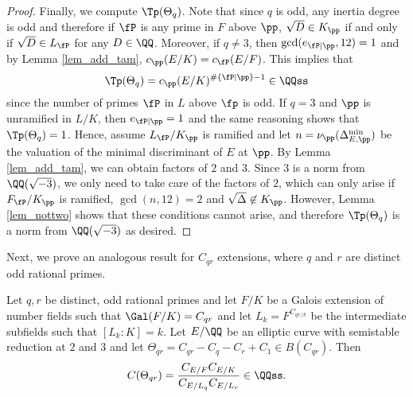 \begin{proof}
    Finally, we compute $\Tp(\Theta_q)$. Note that since $q$ is odd, any inertia degree is odd and therefore if $\fP$ is any prime in $F$ above $\pp$, $\sqrt{D}\in K_\pp$ if and only if $\sqrt{D}\in L_\fP$ for any $D\in\QQ$. Moreover, if $q\neq 3$, then $\gcd(e_{\fP\mid\pp},12)=1$ and by Lemma \ref{lem_add_tam}, $c_\pp(E/K)=c_\fP(E/F)$. This implies that $$\Tp(\Theta_q)=c_\pp(E/K)^{\#\{\fP\mid\pp\}-1}\in\QQss$$ since the number of primes $\fP$ in $L$ above $\fp$ is odd. If $q=3$ and $\pp$ is unramified in $L/K$, then $e_{\fP\mid\pp}=1$ and the same reasoning shows that $\Tp(\Theta_q)=1$. Hence, assume $L_\fP/K_\pp$ is ramified and let $n=\nu_\pp(\Delta_{E,\pp}^{\min})$ be the valuation of the minimal discriminant of $E$ at $\pp$. By Lemma \ref{lem_add_tam}, we can obtain factors of $2$ and $3$. Since $3$ is a norm from $\QQ(\sqrt{-3})$, we only need to take care of the factors of $2$, which can only arise if $F_\fP/K_\pp$ is ramified, $\gcd(n,12)=2$ and $\sqrt{\Delta}\not\in K_\pp$. However, Lemma \ref{lem_nottwo} shows that these conditions cannot arise, and therefore $\Tp(\Theta_q)$ is a norm from $\QQ(\sqrt{-3})$ as desired.
\end{proof}

Next, we prove an analogous result for $C_{qr}$ extensions, where $q$ and $r$ are distinct odd rational primes.

\begin{lemma}\label{lem_Cpq}
    Let $q,r$ be distinct, odd rational primes and let $F/K$ be a Galois extension of number fields such that $\Gal(F/K)=C_{qr}$ and let $L_k=F^{C_{qr/k}}$ be the intermediate subfields such that $[L_k:K]=k$. Let $E/\QQ$ be an elliptic curve with semistable reduction at $2$ and $3$ and let $\Theta_{qr}=C_{qr}-C_q-C_r+C_1\in B(C_{qr})$. Then
    $$C(\Theta_{qr})=\frac{C_{E/F}C_{E/K}}{C_{E/L_q}C_{E/L_r}}\in\QQss.$$
    
\end{lemma}

